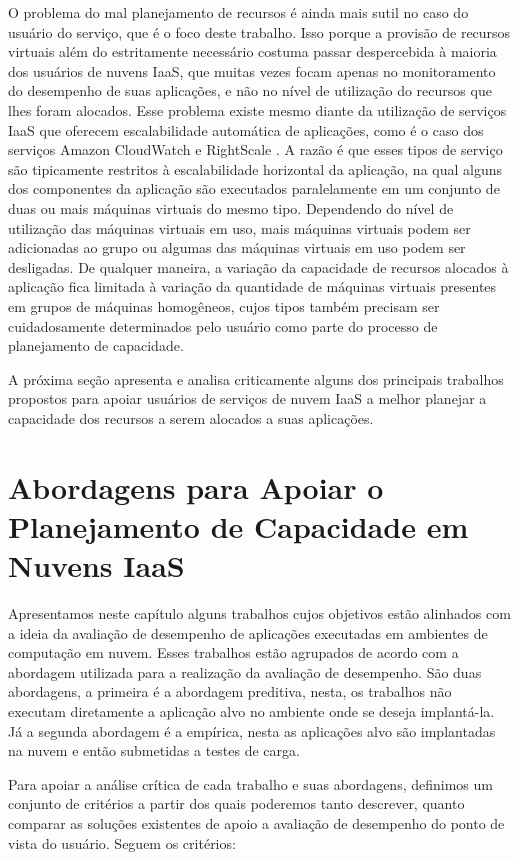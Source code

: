 O problema do mal planejamento de recursos é ainda mais sutil no caso do usuário do serviço, que é o foco deste trabalho. Isso porque a provisão de recursos virtuais além do estritamente necessário costuma passar despercebida à maioria dos usuários de nuvens IaaS, que muitas vezes focam apenas no monitoramento do desempenho de suas aplicações, e não no nível de utilização do recursos que lhes foram alocados. Esse problema existe mesmo diante da utilização de serviços IaaS que oferecem escalabilidade automática de aplicações, como é o caso dos serviços Amazon CloudWatch \cite{amazon_watch} e RightScale \cite{rightscale}. A razão é que esses tipos de serviço são tipicamente restritos à escalabilidade horizontal da aplicação, na qual alguns dos componentes da aplicação são executados paralelamente em um conjunto de duas ou mais máquinas virtuais do mesmo tipo. Dependendo do nível de utilização das máquinas virtuais em uso, mais máquinas virtuais podem ser adicionadas ao grupo ou algumas das máquinas virtuais em uso podem ser desligadas. De qualquer maneira, a variação da capacidade de recursos alocados à aplicação fica limitada à variação da quantidade de máquinas virtuais presentes em grupos de máquinas homogêneos, cujos tipos também precisam ser cuidadosamente determinados pelo usuário como parte do processo de planejamento de capacidade. 

A próxima seção apresenta e analisa criticamente alguns dos principais trabalhos propostos para apoiar usuários de serviços de nuvem IaaS a melhor planejar a capacidade dos recursos a serem alocados a suas aplicações.

\section{Abordagens para Apoiar o Planejamento de Capacidade em Nuvens IaaS}

Apresentamos  neste capítulo alguns trabalhos cujos objetivos estão alinhados 
com a ideia da avaliação de desempenho de aplicações executadas em ambientes de
computação em nuvem. Esses trabalhos estão agrupados de acordo com a abordagem utilizada para a realização da avaliação de desempenho. São duas abordagens, a primeira é a abordagem preditiva, nesta, os trabalhos não executam diretamente a aplicação alvo no ambiente onde se deseja implantá-la. Já a segunda abordagem é a empírica, nesta as aplicações alvo são implantadas na nuvem e então submetidas a testes de carga. 

Para apoiar a análise crítica de cada trabalho e suas abordagens, definimos um conjunto de critérios a partir dos quais poderemos tanto descrever, quanto comparar as soluções existentes de apoio a avaliação de desempenho do ponto de vista do usuário. Seguem os critérios:

